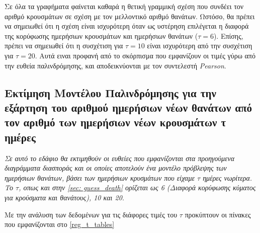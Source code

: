 \documentclass{article}
\begin{document}
Σε όλα τα γραφήματα φαίνεται καθαρά η θετική γραμμική σχέση που συνδέει τον αριθμό κρουσμάτων σε σχέση με τον μελλοντικό αριθμό θανάτων. Ωστόσο, θα πρέπει να σημειωθεί ότι η σχέση είναι ισχυρότερη όταν ως υστέρηση επιλέγεται η διαφορά της κορύφωσης ημερήσιων κρουσμάτων και ημερήσιων θανάτων ($ \tau = 6 $). Επίσης, πρέπει να σημειωθεί ότι η συσχέτιση για $ \tau = 10 $ είναι ισχυρότερη από την συσχέτιση για $ \tau = 20$. Αυτά ειναι προφανή από το σκόρπισμα που εμφανίζουν οι τιμές γύρω από την ευθεία παλινδρόμησης, και αποδεικνύονται με τον συντελεστή \foreignlanguage{english}{\emph{Pearson}}. 

\subsection{Εκτίμηση Μοντέλου Παλινδρόμησης για την εξάρτηση του αριθμού ημερήσιων νέων θανάτων από τον αριθμό των ημερήσιων νέων κρουσμάτων τ ημέρες}

\label{sec:regression_t}

\emph{Σε αυτό το εδάφιο θα εκτιμηθούν οι ευθείες που εμφανίζονται στα προηγούμενα διαγράμματα διασποράς και οι οποίες αποτελούν ένα μοντέλο πρόβλεψης των ημερήσιων θανάτων, βάσει των ημερήσιων κρυσμάτων που είχαμε $ \tau $ ημέρες νωρίτερα. Το $ \tau $, οπως και στην \autoref{sec: guess_death} ορίζεται ως 6 (Διαφορά κορύφωσης κύματος για κρούσματα και θανάτους), 10 και 20.}

Με την ανάλυση των δεδομένων για τις διάφορες τιμές του $ \tau $ προκύπτουν οι πίνακες που εμφανίζονται στο \autoref{reg_t_tables}
\end{document}
